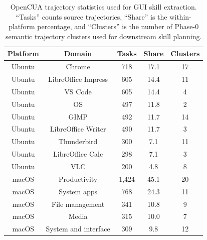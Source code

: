 \documentclass{llmxive}
\begin{document}
\begin{table}[!htbp]
\centering
\small
\setlength{\tabcolsep}{6pt}
\begin{tabular}{ccccc}
\toprule
Platform & Domain & Tasks & Share & Clusters \\
\midrule
Ubuntu & Chrome & 718 & 17.1 & 17 \\
Ubuntu & LibreOffice Impress & 605 & 14.4 & 11 \\
Ubuntu & VS Code & 605 & 14.4 & 4 \\
Ubuntu & OS & 497 & 11.8 & 2 \\
Ubuntu & GIMP & 492 & 11.7 & 14 \\
Ubuntu & LibreOffice Writer & 490 & 11.7 & 3 \\
Ubuntu & Thunderbird & 300 & 7.1 & 11 \\
Ubuntu & LibreOffice Calc & 298 & 7.1 & 3 \\
Ubuntu & VLC & 200 & 4.8 & 8 \\
\midrule
macOS & Productivity & 1,424 & 45.1 & 20 \\
macOS & System apps & 768 & 24.3 & 11 \\
macOS & File management & 341 & 10.8 & 9 \\
macOS & Media & 315 & 10.0 & 7 \\
macOS & System and interface & 309 & 9.8 & 12 \\
\bottomrule
\end{tabular}
\caption{OpenCUA trajectory statistics used for GUI skill extraction. ``Tasks'' counts source trajectories, ``Share'' is the within-platform percentage, and ``Clusters'' is the number of Phase-0 semantic trajectory clusters used for downstream skill planning.}
\label{tab:opencua-source-distribution}
\end{table}
\end{document}
